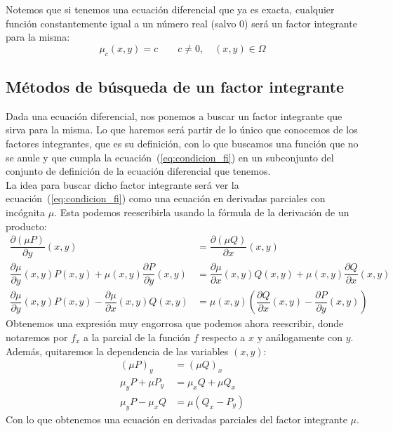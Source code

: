 \begin{observacion}
    Notemos que si tenemos una ecuación diferencial que ya es exacta, cualquier función constantemente igual a un número real (salvo 0) será un factor integrante para la misma:
    \begin{equation*}
        \mu_c(x,y) = c \qquad c\neq 0, \quad (x,y)\in \Omega
    \end{equation*}
\end{observacion}

\subsection{Métodos de búsqueda de un factor integrante}
Dada una ecuación diferencial, nos ponemos a buscar un factor integrante que sirva para la misma. Lo que haremos será partir de lo único que conocemos de los factores integrantes, que es su definición, con lo que buscamos una función que no se anule y que cumpla la ecuación~(\ref{eq:condicion_fi}) en un subconjunto del conjunto de definición de la ecuación diferencial que tenemos.\\

La idea para buscar dicho factor integrante será ver la ecuación~(\ref{eq:condicion_fi}) como una ecuación en derivadas parciales con incógnita $\mu$. Esta podemos reescribirla usando la fórmula de la derivación de un producto:
\begin{align*}
    \dfrac{\partial (\mu P)}{\partial y}(x,y) &= \dfrac{\partial (\mu Q)}{\partial x}(x,y) \\
    \dfrac{\partial \mu}{\partial y}(x,y)P(x,y) + \mu(x,y)\dfrac{\partial P}{\partial y}(x,y) &= \dfrac{\partial \mu}{\partial x}(x,y)Q(x,y) + \mu(x,y) \dfrac{\partial Q}{\partial x}(x,y) \\
    \dfrac{\partial \mu}{\partial y}(x,y)P(x,y) - \dfrac{\partial \mu}{\partial x}(x,y)Q(x,y) &= \mu(x,y)\left(\dfrac{\partial Q}{\partial x}(x,y)-\dfrac{\partial P}{\partial y}(x,y)\right)
\end{align*}
Obtenemos una expresión muy engorrosa que podemos ahora reescribir, donde notaremos por $f_x$ a la parcial de la función $f$ respecto a $x$ y análogamente con $y$. Además, quitaremos la dependencia de las variables $(x,y)$:
\begin{align*}
    (\mu P)_y &= (\mu Q)_x \\
    \mu_y P + \mu P_y &= \mu_x Q + \mu Q_x \\
    \mu_y P - \mu_x Q &= \mu (Q_x - P_y)
\end{align*}
Con lo que obtenemos una ecuación en derivadas parciales del factor integrante $\mu$.\\

